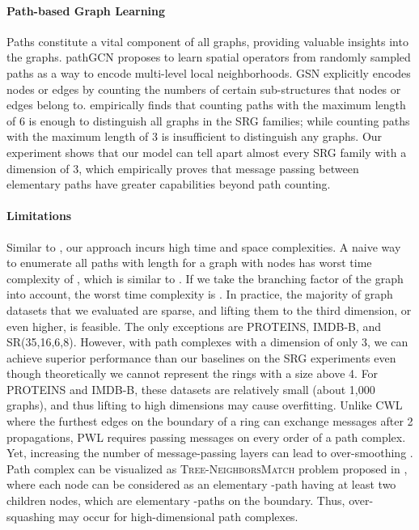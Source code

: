 \documentclass[letterpaper]{article} \usepackage{aaai24}  \usepackage{times}  \usepackage{helvet}  \usepackage{courier}  \usepackage[hyphens]{url}  \usepackage{graphicx} \urlstyle{rm} \def\UrlFont{\rm}  \usepackage{natbib}  \usepackage{caption} \frenchspacing  \setlength{\pdfpagewidth}{8.5in} \setlength{\pdfpageheight}{11in} \usepackage{algorithm}
\begin{document}
\paragraph{Path-based Graph Learning}  Paths constitute a vital component of all graphs, providing valuable insights into the graphs. pathGCN \cite{eliasof_pathgcn_2022} proposes to learn spatial operators from randomly sampled paths as a way to encode multi-level local neighborhoods. GSN \cite{bouritsas_improving_2021} explicitly encodes nodes or edges by counting the numbers of certain sub-structures that nodes or edges belong to. \citeauthor{bouritsas_improving_2021} empirically finds that counting paths with the maximum length of 6 is enough to distinguish all graphs in the SRG families; while counting paths with the maximum length of 3 is insufficient to distinguish any graphs. Our experiment shows that our model can tell apart almost every SRG family with a dimension of 3, which empirically proves that message passing between elementary paths have greater capabilities beyond path counting.

\paragraph{Limitations} Similar to \cite{bodnar_weisfeiler_2021, bodnar_weisfeiler_2022}, our approach incurs high time and space complexities. A naive way to enumerate all paths with length  for a graph with  nodes has worst time complexity of , which is similar to \cite{morris_weisfeiler_2019}. If we take the branching factor  of the graph into account, the worst time complexity is \cite{michel_expressive_2023}. In practice, the majority of graph datasets that we evaluated are sparse, and lifting them to the third dimension, or even higher, is feasible. The only exceptions are PROTEINS, IMDB-B, and SR(35,16,6,8). However, with path complexes with a dimension of only 3, we can achieve superior performance than our baselines on the SRG experiments even though theoretically we cannot represent the rings with a size above 4. For PROTEINS and IMDB-B, these datasets are relatively small (about 1,000 graphs), and thus lifting to high dimensions may cause overfitting. Unlike CWL \cite{bodnar_weisfeiler_2022} where the furthest edges on the boundary of a ring can exchange messages after 2 propagations, PWL requires passing messages on every order of a path complex. Yet, increasing the number of message-passing layers can lead to over-smoothing \cite{oono_graph_2021, li_deeper_2018}. Path complex can be visualized as  \textsc{Tree-NeighborsMatch} problem proposed in \cite{alon_bottleneck_2021}, where each node can be considered as an elementary -path having at least two children nodes, which are elementary -paths on the boundary. Thus, over-squashing may occur for high-dimensional path complexes. 
\end{document}
